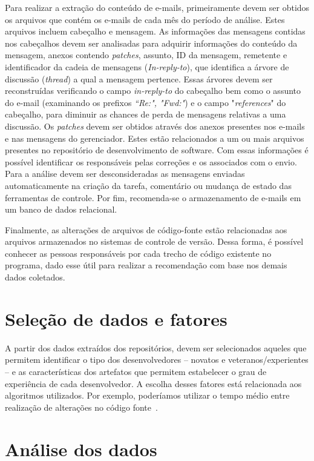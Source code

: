 \documentclass[oneside,brazil,a4paper]{normas-utf-tex}
\begin{document}
Para realizar a extração do conteúdo de e-mails, primeiramente devem ser obtidos os arquivos que contém os e-mails de cada mês do período de análise. Estes arquivos incluem cabeçalho e mensagem. As informações das mensagens contidas nos cabeçalhos devem ser analisadas para adquirir informações do conteúdo da mensagem, anexos contendo \textit{patches}, assunto, ID da mensagem, remetente e identificador da cadeia de mensagens (\textit{In-reply-to}), que identifica a árvore de discussão (\textit{thread}) a qual a mensagem pertence. Essas árvores devem ser reconstruídas verificando o campo \textit{in-reply-to} do cabeçalho bem como o assunto do e-mail (examinando os prefixos \textit{``Re:", "Fwd:"}) e o campo "\textit{references}"  do cabeçalho, para diminuir as chances de perda de mensagens relativas a uma discussão.  Os \textit{patches} devem ser obtidos através dos anexos presentes nos e-mails e nas mensagens do gerenciador. Estes estão relacionados a um ou mais arquivos presentes no repositório de desenvolvimento de software. Com essas informações é possível identificar os responsáveis pelas correções e os associados com o envio. Para a análise devem ser desconsideradas as mensagens enviadas automaticamente na criação da tarefa, comentário ou mudança de estado das ferramentas de controle. Por fim, recomenda-se o armazenamento de e-mails em um banco de dados relacional.

Finalmente, as alterações de arquivos de código-fonte estão relacionadas aos arquivos armazenados no sistemas de controle de versão. Dessa forma, é possível conhecer as pessoas responsáveis por cada trecho de código existente no programa, dado esse útil para realizar a recomendação com base nos demais dados coletados.


\section{Seleção de dados e fatores}

A partir dos dados extraídos dos repositórios, devem ser selecionados aqueles que permitem identificar o tipo dos desenvolvedores -- novatos e veteranos/experientes -- e as características dos artefatos que permitem estabelecer o grau de experiência de cada desenvolvedor. A escolha desses fatores está relacionada aos algoritmos utilizados. Por exemplo, poderíamos utilizar o tempo médio entre realização de alterações no código fonte~\cite{Robbes-etal:2013}.

\section{Análise dos dados}
\end{document}
